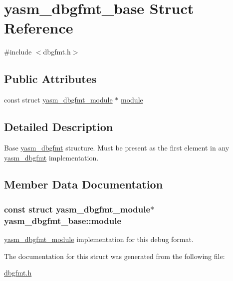 \hypertarget{structyasm__dbgfmt__base}{\section{yasm\-\_\-dbgfmt\-\_\-base Struct Reference}
\label{structyasm__dbgfmt__base}
}


{\ttfamily \#include $<$dbgfmt.\-h$>$}

\subsection*{Public Attributes}
\begin{DoxyCompactItemize}
\item 
const struct \hyperlink{structyasm__dbgfmt__module}{yasm\-\_\-dbgfmt\-\_\-module} $\ast$ \hyperlink{structyasm__dbgfmt__base_a89df532ce6228cad5af1916a971eb15f}{module}
\end{DoxyCompactItemize}


\subsection{Detailed Description}
Base \hyperlink{coretype_8h_ac8215052ae972b3462380abe1fa5291a}{yasm\-\_\-dbgfmt} structure. Must be present as the first element in any \hyperlink{coretype_8h_ac8215052ae972b3462380abe1fa5291a}{yasm\-\_\-dbgfmt} implementation. 

\subsection{Member Data Documentation}
\hypertarget{structyasm__dbgfmt__base_a89df532ce6228cad5af1916a971eb15f}{
\subsubsection[{module}]{\setlength{\rightskip}{0pt plus 5cm}const struct {\bf yasm\-\_\-dbgfmt\-\_\-module}$\ast$ yasm\-\_\-dbgfmt\-\_\-base\-::module}}\label{structyasm__dbgfmt__base_a89df532ce6228cad5af1916a971eb15f}
\hyperlink{structyasm__dbgfmt__module}{yasm\-\_\-dbgfmt\-\_\-module} implementation for this debug format. 

The documentation for this struct was generated from the following file\-:\begin{DoxyCompactItemize}
\item 
\hyperlink{dbgfmt_8h}{dbgfmt.\-h}\end{DoxyCompactItemize}
